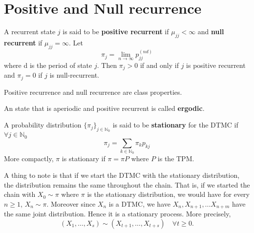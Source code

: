 \documentclass[a4paper,10pt,english]{article}
\begin{document}
\section{Positive and Null recurrence}
A recurrent state $j$ is said to be \textbf{positive recurrent} if $\mu_{jj} < \infty$ and \textbf{null recurrent} if $\mu_{jj} = \infty$. Let
\[\pi_j = \lim_{n \to \infty} p_{jj}^{(nd)}\]
where d is the period of state $j$. Then $\pi_j > 0$ if and only if $j$ is positive recurrent and $\pi_j = 0$ if  $j$ is null-recurrent. 

\begin{prop}
Positive recurrence and null recurrence are class properties.
\end{prop}
\begin{defn}
An state that is aperiodic and positive recurrent is called \textbf{ergodic}.
\end{defn}

\begin{defn}
  A probability distribution $\{\pi_j\}_{j \in \mathbb{N}_0}$ is said to
  be \textbf{stationary} for the DTMC if $\forall j \in \mathbb{N}_0$
\[\pi_j = \sum_{k \in \mathbb{N}_0} \pi_k p_{kj}\]
More compactly, $\pi$ is stationary if $\pi = \pi P$ where $P$ is the TPM.
\end{defn}

A thing to note is that if we start the DTMC with the stationary distribution, the distribution remains the same throughout the chain. That is, if we started the chain with $X_0 \sim \pi$ where $\pi$ is the stationary distribution, we would have for every $n \geq 1$, $X_n \sim \pi$. Moreover since $X_n$ is a DTMC, we have $X_n, X_{n+1}, ... X_{n+m}$ have the same joint distribution. Hence it is a stationary process. More precisely,
\[(X_1,\ldots,X_s)\sim(X_{t+1},\ldots,X_{t+s}) \quad \forall t \geq 0.\]
\end{document}
